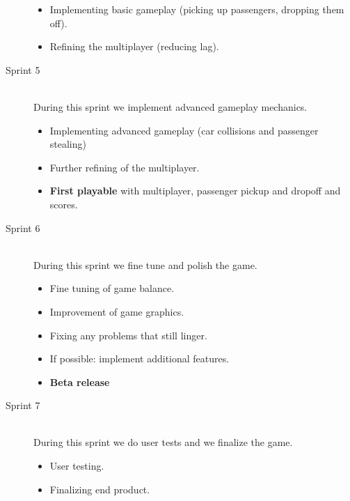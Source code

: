 \documentclass{article}
\begin{document}
\begin{description}
\begin{itemize}
\item Implementing basic gameplay (picking up passengers, dropping them off).
\item Refining the multiplayer (reducing lag).
\end{itemize}
\item[Sprint 5] \hfill \\
During this sprint we implement advanced gameplay mechanics.
\begin{itemize}
\item Implementing advanced gameplay (car collisions and passenger stealing)
\item Further refining of the multiplayer.
\item \textbf{First playable} with multiplayer, passenger pickup and dropoff and scores.
\end{itemize}
\item[Sprint 6] \hfill \\
During this sprint we fine tune and polish the game.
\begin{itemize}
\item Fine tuning of game balance.
\item Improvement of game graphics.
\item Fixing any problems that still linger.
\item If possible: implement additional features.
\item \textbf{Beta release}
\end{itemize}
\item[Sprint 7] \hfill \\
During this sprint we do user tests and we finalize the game.
\begin{itemize}
\item User testing.
\item Finalizing end product.
\end{itemize}
\end{description}
\pagebreak
\end{document}
